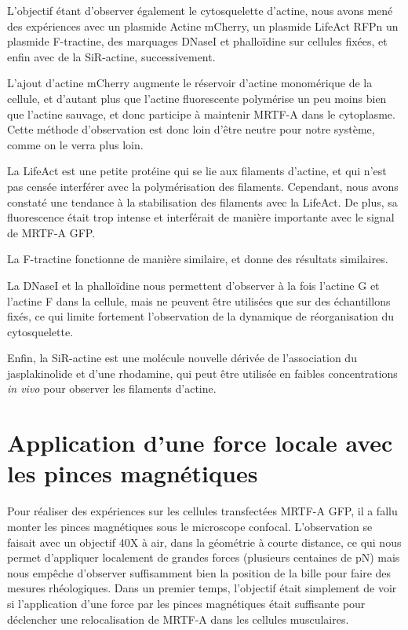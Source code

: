 L'objectif étant d'observer également le cytosquelette d'actine, nous avons mené des expériences avec un plasmide Actine mCherry, un plasmide LifeAct RFPn un plasmide F-tractine, des marquages DNaseI et phalloïdine sur cellules fixées, et enfin avec de la SiR-actine, successivement.
 
L'ajout d'actine mCherry augmente le réservoir d'actine monomérique de la cellule, et d'autant plus que l'actine fluorescente polymérise un peu moins bien que l'actine sauvage, et donc participe à maintenir MRTF-A dans le cytoplasme. 
Cette méthode d'observation est donc loin d'être neutre pour notre système, comme on le verra plus loin.
 
La LifeAct \parencite{riedl_lifeact:_2008} est une petite protéine qui se lie aux filaments d'actine, et qui n'est pas censée interférer avec la polymérisation des filaments. Cependant, nous avons constaté une tendance à la stabilisation des filaments avec la LifeAct. De plus, sa fluorescence était trop intense et interférait de manière importante avec le signal de MRTF-A GFP. 

La F-tractine \parencite{johnson_neuronal_2009} fonctionne de manière similaire, et donne des résultats similaires. 

La DNaseI et la phalloïdine nous permettent d'observer à la fois l'actine G et l'actine F dans la cellule, mais ne peuvent être utilisées que sur des échantillons fixés, ce qui limite fortement l'observation de la dynamique de réorganisation du cytosquelette.
 
Enfin, la SiR-actine \parencite{lukinavicius_fluorogenic_2014} est une molécule nouvelle dérivée de l'association du jasplakinolide et d'une rhodamine, qui peut être utilisée en faibles concentrations \emph{in vivo} pour observer les filaments d'actine. 


\section{Application d'une force locale avec les pinces magnétiques}

Pour réaliser des expériences sur les cellules transfectées MRTF-A GFP, il a fallu monter les pinces magnétiques sous le microscope confocal. 
L'observation se faisait avec un objectif 40X à air, dans la géométrie à courte distance, ce qui nous permet d'appliquer localement de grandes forces (plusieurs centaines de pN) mais nous empêche d'observer suffisamment bien la position de la bille pour faire des mesures rhéologiques. 
Dans un premier temps, l'objectif était simplement de voir si l'application d'une force par les pinces magnétiques était suffisante pour déclencher une relocalisation de MRTF-A dans les cellules musculaires. 

